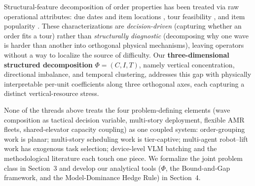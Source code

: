 \documentclass[11pt, a4paper]{article}
\begin{document}
Structural-feature decomposition of order properties has been treated via raw operational attributes: due dates and item locations \citep{scholz2017}, tour feasibility \citep{zulj2022}, and item popularity \citep{qin2024}. These characterizations are \emph{decision-driven} (capturing whether an order fits a tour) rather than \emph{structurally diagnostic} (decomposing why one wave is harder than another into orthogonal physical mechanisms), leaving operators without a way to localize the source of difficulty. Our \textbf{three-dimensional structured decomposition} $\Phi = (C, I, T)$, namely vertical concentration, directional imbalance, and temporal clustering, addresses this gap with physically interpretable per-unit coefficients along three orthogonal axes, each capturing a distinct vertical-resource stress.

None of the threads above treats the four problem-defining elements (wave composition as tactical decision variable, multi-story deployment, flexible AMR fleets, shared-elevator capacity coupling) as one coupled system: order-grouping work is planar; multi-story scheduling work is tier-captive; multi-agent robot--lift work has exogenous task selection; device-level VLM batching and the methodological literature each touch one piece. We formalize the joint problem class in Section~3 and develop our analytical tools ($\Phi$, the Bound-and-Gap framework, and the Model-Dominance Hedge Rule) in Section~4.
\end{document}
